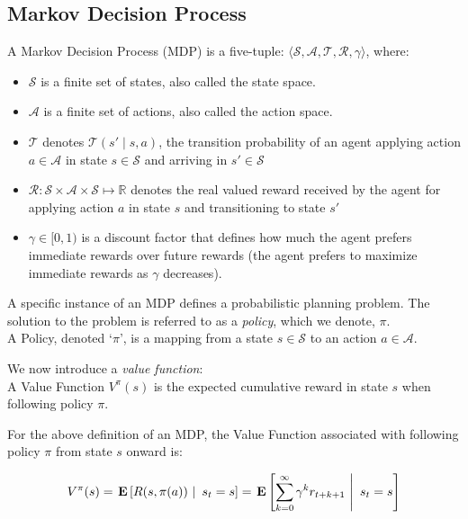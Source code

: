 \documentclass[11pt]{article}
\begin{document}
\subsection{Markov Decision Process}
{ A \textup{Markov Decision Process (MDP)} is a five-tuple: $\langle \mathcal{S},
\mathcal{A}, \mathcal{T}, \mathcal{R}, \gamma \rangle$, where:
\begin{itemize}
\item $\mathcal{S}$ is a finite set of states, also called the \textup{state space}.
\item $\mathcal{A}$ is a finite set of actions, also called the \textup{action space}.
\item $\mathcal{T}$ denotes $\mathcal{T}(s' \mid s,a)$, the
transition probability of an agent applying action $a \in \mathcal{A}$
in state $s \in \mathcal{S}$ and arriving in $s' \in \mathcal{S}$
\item $\mathcal{R} : \mathcal{S} \times \mathcal{A} \times \mathcal{S} \mapsto \mathbb{R}$ denotes the real valued reward received by the agent for
applying action $a$ in state $s$ and transitioning to state $s'$
\item $\gamma \in [0, 1)$ is a discount factor that defines how much the
  agent prefers immediate rewards over future rewards (the agent
  prefers to maximize immediate rewards as $\gamma$ decreases).
\end{itemize}}

A specific instance of an MDP defines a probabilistic planning problem. The solution to the problem is referred to as a {\it policy}, which we denote, $\pi$. \\

{ A \textup{Policy}, denoted `$\pi$', is a mapping from a state $s \in \mathcal{S}$ to an action $a \in \mathcal{A}$.}

We now introduce a {\it value function}: \\

{ A \textup{Value Function} $V^\pi(s)$ is the expected cumulative reward in state $s$ when following policy $\pi$.}

For the above definition of an MDP, the Value Function associated with following policy $\pi$ from state $s$ onward is:

\begin{equation}
V^\pi(s) = \left.\E{R(s,\pi(a))\ \right|\ s_t = s} = \left.\E{\sum_{k=0}^\infty \gamma^k r_{t+k+1}\ \right|\ s_t = s}
\end{equation}
\end{document}

